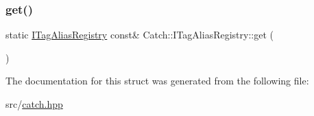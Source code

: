 \mbox{\label{struct_catch_1_1_i_tag_alias_registry_aa9d0f008f49473389c7abf6071f137a7}} 
\subsubsection{\texorpdfstring{get()}{get()}}
{\footnotesize\ttfamily static \hyperlink{struct_catch_1_1_i_tag_alias_registry}{I\+Tag\+Alias\+Registry} const\& Catch\+::\+I\+Tag\+Alias\+Registry\+::get (\begin{DoxyParamCaption}{ }\end{DoxyParamCaption})\hspace{0.3cm}{\ttfamily [static]}}



The documentation for this struct was generated from the following file\+:\begin{DoxyCompactItemize}
\item 
src/\hyperlink{catch_8hpp}{catch.\+hpp}\end{DoxyCompactItemize}
